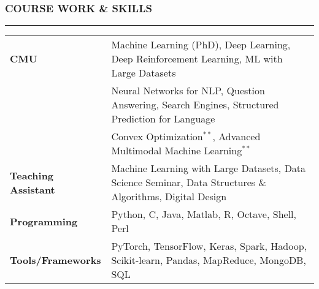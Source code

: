 \documentclass[10pt,a4paper,English]{article}
\newcommand\roottitle[1]{\vspace{-4mm}\subsubsection*{\uppercase{#1}}\vspace{-0.3em}\nopagebreak[4]\hrule\vspace{4mm}}
\newcommand\itemyear[1]{\hfill \emph{\color{itemyear} #1}}
\newcommand\itemenv{\setlength\itemsep{0.5pt} \addtolength{\itemindent}{-5mm}\vspace{-1.5mm}}
\begin{document}
\roottitle{Course Work \& Skills}
\vspace{-2mm}
\renewcommand{\arraystretch}{1.2}
\setlength\tabcolsep{0pt}
\begin{tabularx}{\textwidth}{ l @{ - } X }
\textbf{CMU}                        & Machine Learning (PhD), Deep Learning, Deep Reinforcement Learning, ML with Large Datasets  \\
                                    & Neural Networks for NLP, Question Answering, Search Engines, Structured Prediction for Language \\
                                    & Convex Optimization$^{**}$, Advanced Multimodal Machine Learning$^{**}$ \\
\textbf{Teaching Assistant}         & Machine Learning with Large Datasets, Data Science Seminar, Data Structures \& Algorithms, Digital Design \\
\textbf{Programming}                & Python, C, Java, Matlab, R, Octave, Shell, Perl \\
\textbf{Tools/Frameworks}           & PyTorch, TensorFlow, Keras, Spark, Hadoop, Scikit-learn, Pandas, MapReduce, MongoDB, SQL \\
\end{tabularx}
\vspace{2mm}

\vspace{1mm}

\noindent {}\\
\noindent {}
\end{document}
